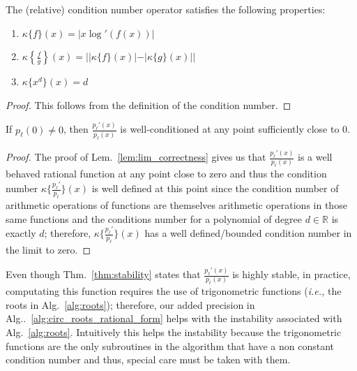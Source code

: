 \documentclass[runningheads]{llncs}
\begin{document}
\begin{lemma}
The (relative) condition number operator satisfies the following properties:
\begin{enumerate}
  \item $\kappa\{f\} (x) = |x \log'(f(x)) |$
  \item $\kappa \left\{\frac{f}{g}\right\} (x)= ||\kappa\{ f\} (x)| - |\kappa\{ g\} (x)||$
    \item $\kappa \{x^ d \} (x)= d$
\end{enumerate}
\end{lemma}
\begin{proof}
This follows from the definition of the condition number.
\end{proof}
\begin{theorem}\label{thm:stability}
If $p_\ell(0)\neq 0$, then $\frac{p_{\ell}'(x)}{p_{\ell}(x)}$ is well-conditioned at any point sufficiently close to 0.
\end{theorem}
\begin{proof}
  The proof of Lem.~\ref{lem:lim_correctness} gives us that $\frac{p_{\ell}'(x)}{p_{\ell}(x)}$ is a well behaved rational function at any point close to zero and thus the condition number $\kappa\{\frac{p_{\ell}'}{p_{\ell}}\}(x)$ is well defined at this point since the condition number of arithmetic operations of functions are themselves arithmetic operations in those same functions and the conditions number for a polynomial of degree $d \in \mathbb{R}$ is exactly $d$; therefore, $\kappa\{\frac{p_{\ell}'}{p_{\ell}}\}(x)$ has a well defined/bounded condition number in the limit to zero.
\end{proof}

\begin{remark}
Even though Thm.~\ref{thm:stability} states that $\frac{p_{\ell}'(x)}{p_{\ell}(x)}$ is highly stable, in practice, computating this function requires the use of trigonometric functions (\emph{i.e.,} the roots in Alg.~\ref{alg:roots}); therefore, our added precision in Alg..~\ref{alg:circ_roots_rational_form} helps with the instability associated with Alg.~\ref{alg:roots}. Intuitively this helps the instability because the trigonometric functions are the only subroutines in the algorithm that have a non constant condition number and thus, special care must be taken with them.
\end{remark}
\end{document}
